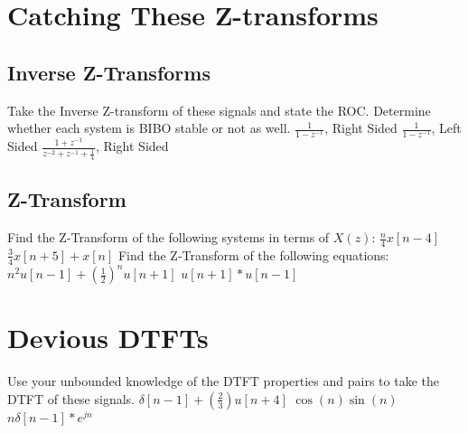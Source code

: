 \documentclass{article}
\begin{document}
\section{Catching These Z-transforms}

\subsection{Inverse Z-Transforms}
Take the Inverse Z-transform of these signals and state the ROC. Determine whether each system is BIBO stable or not as well.
\newline\newline
$\frac{1}{1-z^{-1}}$, Right Sided
\newline\newline
$\frac{1}{1-z^{-1}}$, Left Sided
\newline\newline
$\frac{1 + z^{-1}}{z^{-2} + z^{-1} + \frac{1}{4}}$, Right Sided

\subsection{Z-Transform}

Find the Z-Transform of the following systems in terms of $X(z)$:
\newline\newline
$\frac{n}{4} x[n-4] $
\newline\newline
$\frac{3}{4} x[n+5] + x[n]$
\newline\newline
Find the Z-Transform of the following equations:
\newline\newline
$n^2 u[n-1] + (\frac{1}{2})^n u[n+1]$
\newline\newline
$u[n+1] * u[n-1]$

\section{Devious DTFTs}
Use your unbounded knowledge of the DTFT properties and pairs to take the DTFT of these signals.
\newline\newline
$\delta[n-1] + (\frac{2}{3})u[n+4]$
\newline\newline
$\cos(n)\sin(n)$
\newline\newline
$n\delta[n-1]*e^{jn}$
\end{document}
